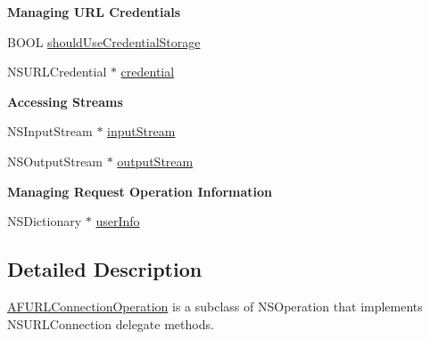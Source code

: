 \begin{Indent}{\bf Managing U\-R\-L Credentials}\par
{\em 

 

 }\begin{DoxyCompactItemize}
\item 
B\-O\-O\-L \hyperlink{interface_a_f_u_r_l_connection_operation_a48bd01b0c9afd1f5234d01d28e3764e7}{should\-Use\-Credential\-Storage}
\item 
N\-S\-U\-R\-L\-Credential $\ast$ \hyperlink{interface_a_f_u_r_l_connection_operation_a3117677d8c96460f0bd1b4d3b13b6da8}{credential}
\end{DoxyCompactItemize}
\end{Indent}
\begin{Indent}{\bf Accessing Streams}\par
{\em 

 

 }\begin{DoxyCompactItemize}
\item 
N\-S\-Input\-Stream $\ast$ \hyperlink{interface_a_f_u_r_l_connection_operation_a2a8f5ad38fa0f464f0104f9e46cf4043}{input\-Stream}
\item 
N\-S\-Output\-Stream $\ast$ \hyperlink{interface_a_f_u_r_l_connection_operation_a369c54f83f2edaae3a726e6cde799fb8}{output\-Stream}
\end{DoxyCompactItemize}
\end{Indent}
\begin{Indent}{\bf Managing Request Operation Information}\par
{\em 

 

 }\begin{DoxyCompactItemize}
\item 
N\-S\-Dictionary $\ast$ \hyperlink{interface_a_f_u_r_l_connection_operation_a9e684ec568c6dd79497ef36b84511d15}{user\-Info}
\end{DoxyCompactItemize}
\end{Indent}


\subsection{Detailed Description}
{\ttfamily \hyperlink{interface_a_f_u_r_l_connection_operation}{A\-F\-U\-R\-L\-Connection\-Operation}} is a subclass of {\ttfamily N\-S\-Operation} that implements {\ttfamily N\-S\-U\-R\-L\-Connection} delegate methods.


